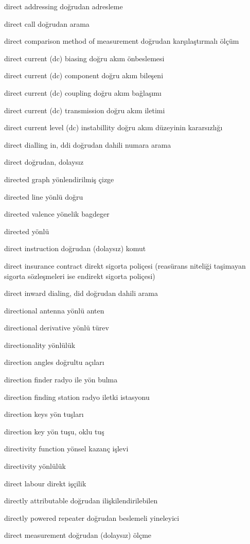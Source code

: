 \documentclass[12pt,fleqn]{article}\usepackage{../../common}
\begin{document}
direct addressing doğrudan adresleme

direct call doğrudan arama

direct comparison method of measurement doğrudan karşılaştırmalı ölçüm

direct current (dc) biasing doğru akım önbeslemesi

direct current (dc) component doğru akım bileşeni

direct current (dc) coupling doğru akım bağlaşımı

direct current (dc) transmission doğru akım iletimi

direct current level (dc) instabillity doğru akım düzeyinin kararsızlığı

direct dialling in, ddi doğrudan dahili numara arama

direct doğrudan, dolaysız

directed graph yönlendirilmiş çizge

directed line yönlü doğru

directed valence yönelik bagdeger

directed yönlü

direct instruction doğrudan (dolaysız) komut

direct insurance contract direkt sigorta poliçesi (reasürans niteliği taşimayan sigorta sözleşmeleri ise endirekt sigorta poliçesi)

direct inward dialing, did doğrudan dahili arama

directional antenna yönlü anten

directional derivative yönlü türev

directionality yönlülük

direction angles doğrultu açıları

direction finder radyo ile yön bulma

direction finding station radyo iletki istasyonu

direction keys yön tuşları

direction key yön tuşu, oklu tuş

directivity function yönsel kazanç işlevi

directivity yönlülük

direct labour direkt işçilik

directly attributable doğrudan ilişkilendirilebilen

directly powered repeater doğrudan beslemeli yineleyici

direct measurement doğrudan (dolaysız) ölçme
\end{document}
